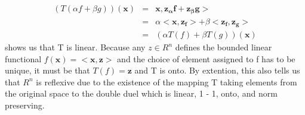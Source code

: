 \documentclass[11pt]{SelfArxOneColBMN}
\begin{document}
\begin{solution}
  \begin{eqnarray*}
    (T(\alpha f + \beta g))(\mathbf{x}) &=& \mathbf{x},\mathbf{z_\alpha f}+\mathbf{z_\beta g}>\\
    &=& \alpha <\mathbf{x},\mathbf{z_f}> + \beta <\mathbf{z_f}, \mathbf{z_g}>\\
    &=& (\alpha T(f) + \beta T(g))(\mathbf{x})
  \end{eqnarray*}
  shows us that T is linear. Because any $z \in R^n$ defines the bounded linear functional $f(\mathbf{x}) = <\mathbf{x}, \mathbf{z}>$ and the choice of element assigned to f has to be unique, it must be that $T(f) = \mathbf{z}$ and T is onto. By extention, this also tells us that $R^n$ is reflexive due to the existence of the mapping T taking elements from the original space to the double duel which is linear, 1 - 1, onto, and norm preserving.
\end{solution}
\end{document}
